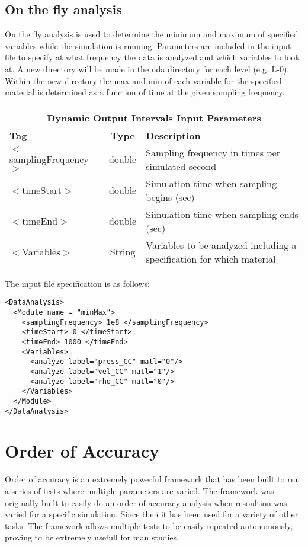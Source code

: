 \section{On the fly analysis}
On the fly analysis is used to determine the minimum and maximum of specified variables while the simulation is running.  Parameters are included in the input file to specify at what frequency the data is analyzed and which variables to look at. A new directory will be made in the uda directory for each level (e.g. L-0). Within the new directory the max and min of each variable for the specified material is determined as a function of time at the given sampling frequency.

\begin{center}
\begin{tabular}{| l | c | p{7cm} |}
\hline
  \multicolumn{3}{|c|}{\textbf{Dynamic Output Intervals Input Parameters}} \\
\hline
\hline
  \textbf{Tag} & \textbf{Type} & \textbf{Description}\\
\hline
  $<$samplingFrequency$>$ & double & Sampling frequency in times per simulated second\\
\hline
  $<$timeStart$>$ & double & Simulation time when sampling begins (sec)\\
\hline
  $<$timeEnd$>$ & double & Simulation time when sampling ends (sec)\\
\hline
  $<$Variables$>$ & String & Variables to be analyzed including a specification for which material\\
\hline
\end{tabular}
\end{center}


The input file specification is as follows:
\begin{verbatim}
<DataAnalysis>
  <Module name = "minMax">
    <samplingFrequency> 1e8 </samplingFrequency>
    <timeStart> 0 </timeStart>
    <timeEnd> 1000 </timeEnd>
    <Variables>
      <analyze label="press_CC" matl="0"/>
      <analyze label="vel_CC" matl="1"/>
      <analyze label="rho_CC" matl="0"/>
    </Variables>
  </Module>
</DataAnalysis>
\end{verbatim}

\chapter{Order of Accuracy}
\label{chap:OA}

Order of accuracy is an extremely powerful framework that has been built to run a series of tests where multiple parameters are varied. The framework was originally built to easily do an order of accuracy analysis when resoultion was varied for a specific simulation. Since then it has been used for a variety of other tasks. The framework allows multiple tests to be easily repeated autonomously, proving to be extremely usefull for man studies.

